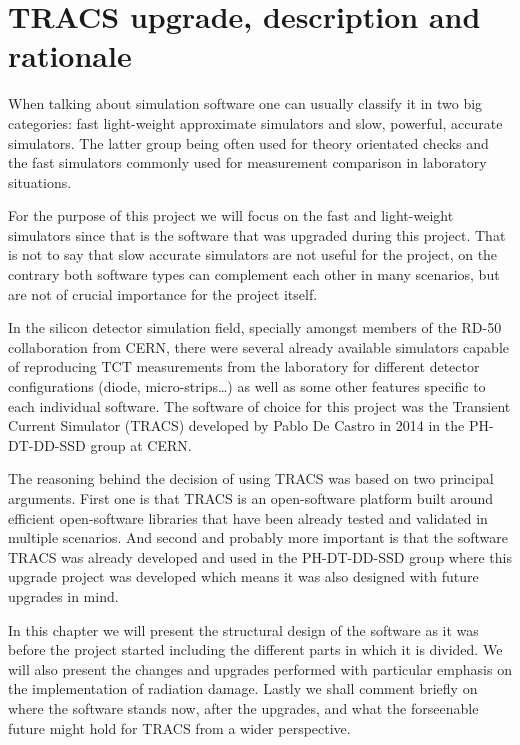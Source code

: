 \chapter{TRACS upgrade, description and rationale}
\label{chap:tracs}

When talking about simulation software one can usually classify it in two big categories: fast light-weight approximate simulators and slow, powerful, accurate simulators. The latter group being often used for theory orientated checks and the fast simulators commonly used for measurement comparison in laboratory situations.

For the purpose of this project we will focus on the fast and light-weight simulators since that is the software that was upgraded during this project. That is not to say that slow accurate simulators are not useful for the project, on the contrary both software types can complement each other in many scenarios, but are not of crucial importance for the project itself.

In the silicon detector simulation field, specially amongst members of the RD-50 collaboration from CERN, there were several already available simulators capable of reproducing TCT measurements from the laboratory for different detector configurations (diode, micro-strips\ldots) as well as some other features specific to each individual software. The software of choice for this project was the Transient Current Simulator (TRACS) developed by Pablo De Castro in 2014 in the PH-DT-DD-SSD group at CERN. 

The reasoning behind the decision of using TRACS was based on two principal arguments. First one is that TRACS is an open-software platform built around efficient open-software libraries that have been already tested and validated in multiple scenarios. And second and probably more important is that the software TRACS was already developed and used in the PH-DT-DD-SSD group where this upgrade project was developed which means it was also designed with future upgrades in mind. 

In this chapter we will present the structural design of the software as it was before the project started including the different parts in which it is divided. We will also present the changes and upgrades performed with particular emphasis on the implementation of radiation damage. Lastly we shall comment briefly on where the software stands now, after the upgrades, and what the forseenable future might hold for TRACS from a wider perspective.

